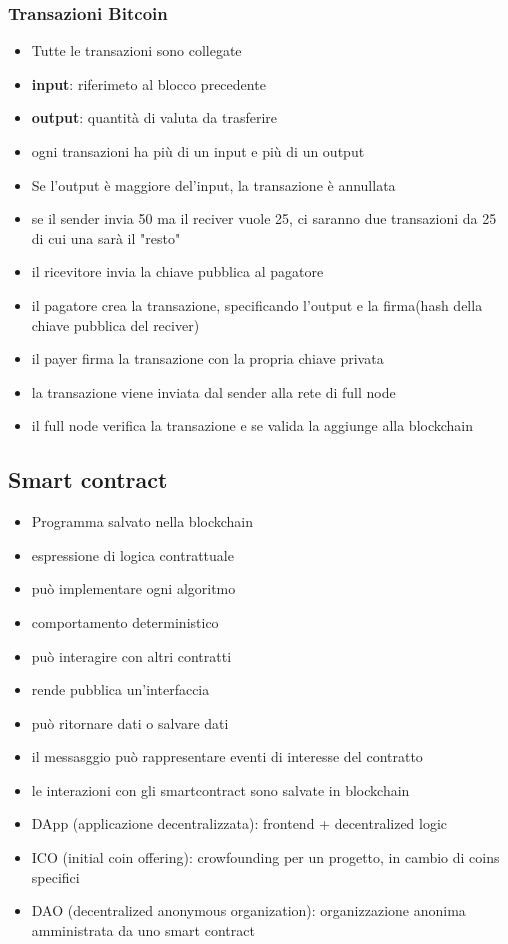 \subsubsection{Transazioni Bitcoin}
\begin{itemize}
    \item Tutte le transazioni sono collegate
    \item \textbf{input}: riferimeto al blocco precedente
    \item \textbf{output}: quantità di valuta da trasferire
    \item ogni transazioni ha più di un input e più di un output
    \item Se l'output è maggiore del'input, la transazione è annullata
    \item se il sender invia 50 ma il reciver vuole 25, ci saranno due transazioni da 25 di cui una sarà il "resto"
    \item il ricevitore invia la chiave pubblica al pagatore
    \item il pagatore crea la transazione, specificando l'output e la firma(hash della chiave pubblica del reciver)
    \item il payer firma la transazione con la propria chiave privata
    \item la transazione viene inviata dal sender alla rete di full node
    \item il full node verifica la transazione e se valida la aggiunge alla blockchain
\end{itemize}

\subsection{Smart contract}
\begin{itemize}
    \item Programma salvato nella blockchain
    \item espressione di logica contrattuale
    \item può implementare ogni algoritmo
    \item comportamento deterministico
    \item può interagire con altri contratti
    \item rende pubblica un'interfaccia
    \item può ritornare dati o salvare dati
    \item il messasggio può rappresentare eventi di interesse del contratto
    \item le interazioni con gli smartcontract sono salvate in blockchain
    \item DApp (applicazione decentralizzata): frontend + decentralized logic
    \item ICO (initial coin offering): crowfounding per un progetto, in cambio di coins specifici
    \item DAO (decentralized anonymous organization): organizzazione anonima amministrata da uno smart contract
\end{itemize}

